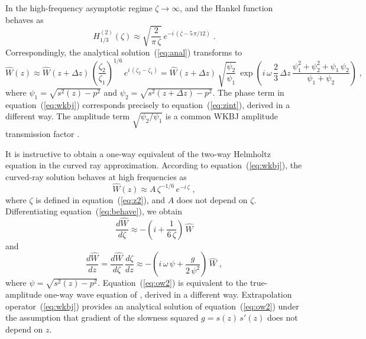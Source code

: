 In the high-frequency asymptotic regime $\zeta \rightarrow \infty$, and 
the Hankel function behaves as \cite[]{watson}
\begin{equation}
  \label{eq:asymp}
  H_{1/3}^{(2)}(\zeta) \approx \sqrt{\frac{2}{\pi\,\zeta}}\,
  e^{-i\,(\zeta - 5\,\pi/12)}\;.
\end{equation}
Correspondingly, the analytical solution~(\ref{eq:anal}) transforms
to
\begin{equation}
  \label{eq:wkbj}
  \widehat{W}(z) \approx \widehat{W}(z+\Delta z)\,\left(\frac{\zeta_2}{\zeta_1}\right)^{1/6}\,
  e^{i\,(\zeta_2 - \zeta_1)}
  = \widehat{W}(z+\Delta z)\,\sqrt{\frac{\psi_2}{\psi_1}}\,
  \exp{\left(i\,\omega\,\frac{2}{3}\,\Delta z\,
      \frac{\psi_1^2+\psi_2^2+\psi_1\,\psi_2}{\psi_1+\psi_2}\right)}
  \;,
\end{equation}
where $\psi_1 = \sqrt{s^2(z)-p^2}$ and $\psi_2 = \sqrt{s^2(z+\Delta
  z)-p^2}$. The phase term in equation~(\ref{eq:wkbj}) corresponds
precisely to equation~(\ref{eq:zint}), derived in a different way. The
amplitude term $\sqrt{\psi_2/\psi_1}$ is a common WKBJ amplitude transmission
factor \cite[]{stolt}.

\newpage


It is instructive to obtain a one-way equivalent of the two-way Helmholtz
equation in the curved ray approximation. According to
equation~(\ref{eq:wkbj}), the curved-ray solution behaves at high frequencies
as
\begin{equation}
  \label{eq:behave}
  \widehat{W}(z) \approx A\,\zeta^{-1/6}\,e^{-i\,\zeta}\;,
\end{equation}
where $\zeta$ is defined in equation~(\ref{eq:z2}), and $A$ does not depend on
$\zeta$. Differentiating equation~(\ref{eq:behave}), we obtain
\begin{equation}
  \label{eq:ow1}
  \frac{d \widehat{W}}{d \zeta} \approx 
  - \left(i + \frac{1}{6\,\zeta}\right)\,\widehat{W}
\end{equation}
and
\begin{equation}
  \label{eq:ow2}
  \frac{d \widehat{W}}{d z} = 
\frac{d \widehat{W}}{d \zeta}\,\frac{d \zeta}{d z}
\approx 
  - \left(i\,\omega\,\psi + \frac{g}{2\,\psi^2}\right)\,
  \widehat{W}\;,
\end{equation}
where $\psi = \sqrt{s^2(z)-p^2}$. Equation~(\ref{eq:ow2}) is
equivalent to the true-amplitude one-way wave equation of
\cite[]{SEG-2003-09250928}, derived in a different way. Extrapolation
operator~(\ref{eq:wkbj}) provides an analytical solution of
equation~(\ref{eq:ow2}) under the assumption that gradient of the
slowness squared $g=s(z)\,s'(z)$ does not depend on $z$.


